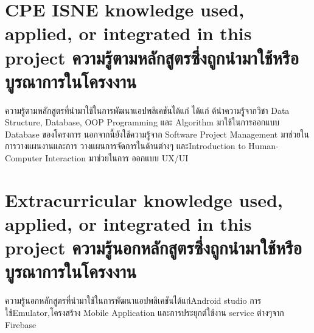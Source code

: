 \section{\ifenglish%
\ifcpe CPE \else ISNE \fi knowledge used, applied, or integrated in this project
\else%
ความรู้ตามหลักสูตรซึ่งถูกนำมาใช้หรือบูรณาการในโครงงาน
\fi
}

ความรู้ตามหลักสูตรที่นํามาใช้ในการพัฒนาแอปพลิเคชันได้แก่ ได้แก่ ด้นําความรู้จากวิชา Data Structure, Database, OOP Programming และ Algorithm มาใช้ในการออกแบบ Database ของโครงการ นอกจากนี้ยังใช้ความรู้จาก Software Project Management มาช่วยในการวางแผนงานและการ
วางแผนการจัดการในด้านต่างๆ และIntroduction to Human-Computer Interaction มาช่วยในการ
ออกแบบ UX/UI

\section{\ifenglish%
Extracurricular knowledge used, applied, or integrated in this project
\else%
ความรู้นอกหลักสูตรซึ่งถูกนำมาใช้หรือบูรณาการในโครงงาน
\fi
}

ความรู้นอกหลักสูตรที่นํามาใช้ในการพัฒนาแอปพลิเคชันได้แก่Android studio การใช้Emulator,โครงสร้าง
Mobile Application และการประยุกต์ใช้งาน service ต่างๆจาก Firebase
